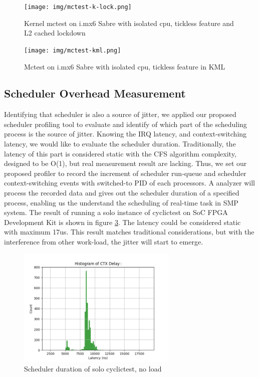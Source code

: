\documentclass[conference]{IEEEtran}
\begin{document}
    \begin{figure} \centering \texttt{[image: img/mctest-k-lock.png]} \caption{Kernel mctest on i.mx6 Sabre
    with isolated cpu, tickless feature and L2 cached lockdown} \label{fig:imx6_mctest_k_lock} \end{figure}
    
    \begin{figure} \centering \texttt{[image: img/mctest-kml.png]} \caption{Mctest on i.mx6 Sabre with
    isolated cpu, tickless feature in KML} \label{fig:imx6_mctest_kml} \end{figure}
    
\subsection{Scheduler Overhead Measurement}
    
    Identifying that scheduler is also a source of jitter, we applied our proposed scheduler profiling tool to evaluate
    and identify of which part of the scheduling process is the source of jitter. Knowing the IRQ latency, and
    context-switching latency, we would like to evaluate the scheduler duration. Traditionally, the latency of this part
    is considered static with the CFS algorithm complexity, designed to be O(1), but real measurement result are
    lacking. Thus, we set our proposed profiler to record the increment of scheduler run-queue and scheduler
    context-switching events with switched-to PID of each processors. A analyzer will process the recorded data and
    gives out the scheduler duration of a specified process, enabling us the understand the scheduling of real-time task
    in SMP system. The result of running a solo instance of cyclictest on SoC FPGA Development Kit is shown in figure
    \ref{fig:sd_noload}. The latency could be considered static with maximum 17us. This result matches traditional
    considerations, but with the interference from other work-load, the jitter will start to emerge.

    \begin{figure} \centering \includegraphics[width=3in]{img/sd-noload.png} \caption{Scheduler duration of solo
    cyclictest, no load} \label{fig:sd_noload} \end{figure}
\end{document}
